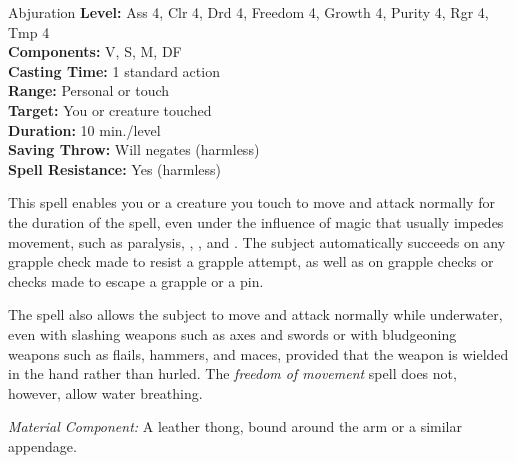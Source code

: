{Abjuration}
{
	\textbf{Level:}
	Ass 4, Clr 4, Drd 4, Freedom 4, Growth 4, Purity 4, Rgr 4, Tmp 4\\
	\textbf{Components:}
	V, S, M, DF\\
	\textbf{Casting Time:}
	1 standard action\\
	\textbf{Range:}
	Personal or touch\\
	\textbf{Target:}
	You or creature touched\\
	\textbf{Duration:}
	10 min./level\\
	\textbf{Saving Throw:}
	Will negates (harmless)\\
	\textbf{Spell Resistance:}
	Yes (harmless)\\
}
{
	This spell enables you or a creature you touch to move and attack normally for the duration of the spell, even under the influence of magic that usually impedes movement, such as paralysis, , , and . The subject automatically succeeds on any grapple check made to resist a grapple attempt, as well as on grapple checks or  checks made to escape a grapple or a pin.

	The spell also allows the subject to move and attack normally while underwater, even with slashing weapons such as axes and swords or with bludgeoning weapons such as flails, hammers, and maces, provided that the weapon is wielded in the hand rather than hurled. The \emph{freedom of movement} spell does not, however, allow water breathing.

	\textit{Material Component:}
	A leather thong, bound around the arm or a similar appendage.

}
